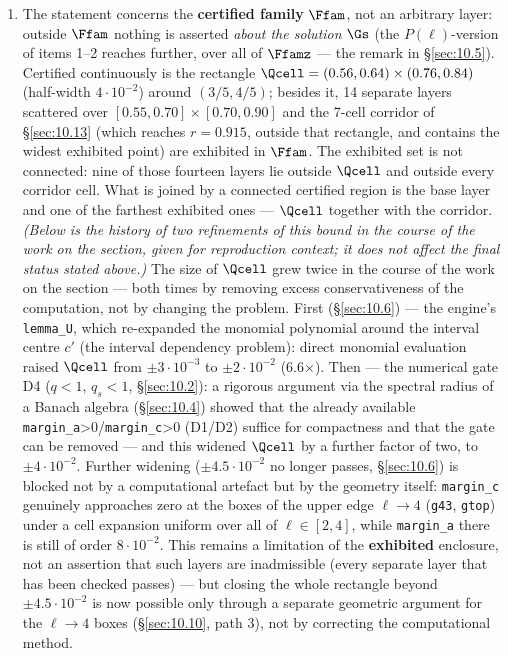 \begin{enumerate}
\item The statement concerns the \textbf{certified family} $\Ffam$, not an arbitrary
   layer: outside $\Ffam$ nothing is asserted \emph{about the solution} $\Gs$
   (the $P(\ell)$-version of items 1--2 reaches further, over all of $\Ffamz$ ---
   the remark in \S\ref{sec:10.5}). Certified continuously is the
   rectangle $\Qcell = (0.56, 0.64) \times (0.76, 0.84)$ (half-width $4\cdot 10^{-2}$)
   around $(3/5, 4/5)$; besides it, 14 separate layers scattered over
   $[0.55, 0.70] \times [0.70, 0.90]$ and the 7-cell corridor of
   \S\ref{sec:10.13} (which reaches $r = 0.915$, outside that rectangle,
   and contains the widest exhibited point) are exhibited in $\Ffam$.
   The exhibited set is not connected: nine of those fourteen layers lie
   outside $\Qcell$ and outside every corridor cell. What is joined by a
   connected certified region is the base layer and one of the farthest
   exhibited ones --- $\Qcell$ together with the corridor. \emph{(Below is the
   history of two refinements of this bound in the course of the work on
   the section, given for reproduction context; it does not affect the
   final status stated above.)} The size of $\Qcell$ grew twice in the
   course of the work on the section --- both times by removing excess
   conservativeness of the computation, not by changing the problem.
   First (\S\ref{sec:10.6}) --- the engine's \texttt{lemma\_U}, which re-expanded the monomial
   polynomial around the interval centre $c'$ (the interval dependency
   problem): direct monomial evaluation raised $\Qcell$ from $\pm 3\cdot 10^{-3}$ to
   $\pm 2\cdot 10^{-2}$ (6.6$\times$). Then --- the numerical gate D4
   ($q<1$, $q_s<1$, \S\ref{sec:10.2}): a rigorous argument via the spectral radius of
   a Banach algebra (\S\ref{sec:10.4}) showed that the already available
   \texttt{margin\_a}>0/\texttt{margin\_c}>0 (D1/D2) suffice for compactness and that the
   gate can be removed --- and this widened $\Qcell$ by a further factor of
   two, to $\pm 4\cdot 10^{-2}$. Further widening ($\pm 4.5\cdot 10^{-2}$ no longer passes,
   \S\ref{sec:10.6}) is blocked not by a computational artefact but by the geometry
   itself: \texttt{margin\_c} genuinely approaches zero at the boxes of
   the upper edge $\ell \to 4$ (\texttt{g43}, \texttt{gtop}) under a cell expansion uniform
   over all of $\ell \in [2,4]$, while \texttt{margin\_a} there is still of order
   $8\cdot 10^{-2}$. This remains a limitation of the \textbf{exhibited}
   enclosure, not an assertion that such layers are inadmissible (every
   separate layer that has been checked passes) --- but closing the whole
   rectangle beyond $\pm 4.5\cdot 10^{-2}$ is now possible only through a separate
   geometric argument for the $\ell \to 4$ boxes (\S\ref{sec:10.10}, path 3), not by
   correcting the computational method.


\end{enumerate}
